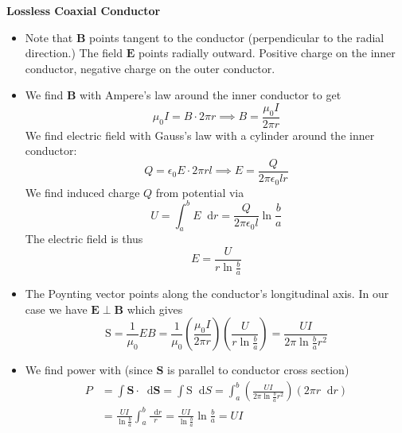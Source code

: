 \documentclass[11pt, a4paper]{article}
\newcommand{\diff}{\mathop{}\!\mathrm{d}} %
\renewcommand{\vec}[1]{\bm{#1}} %
\newcommand{\E}{\vec{E}}  %
\newcommand{\B}{\vec{B}}  %
\renewcommand{\S}{\mathbf{S}}  %
\renewcommand{\SS}{\mathrm{S}}  %
\newcommand{\ee}{\epsilon_{0}}  %
\newcommand{\mm}{\mu_{0}}  %
\newcommand{\m}{\vec{m}}  %
\newcommand{\Poy}{Poynting\xspace}
\begin{document}
\textbf{Lossless Coaxial Conductor}
\begin{itemize}
	\item Note that $ \B $ points tangent to the conductor (perpendicular to the radial direction.) The field $ \E $ points radially outward. Positive charge on the inner conductor, negative charge on the outer conductor.
	
	\item We find $ \B $ with Ampere's law around the inner conductor to get
	\begin{equation*}
		\mm I = B \cdot 2\pi r \implies B = \frac{\mm I}{2\pi r}
	\end{equation*}
	We find electric field with Gauss's law with a cylinder around the inner conductor:
	\begin{equation*}
		Q = \ee E \cdot 2\pi r l \implies E = \frac{Q}{2\pi \ee l r}
	\end{equation*}
	We find induced charge $ Q $ from potential via
	\begin{equation*}
		U = \int_{a}^{b} E \diff r = \frac{Q}{2\pi \ee l}\ln \frac{b}{a}
	\end{equation*}
	The electric field is thus
	\begin{equation*}
		E = \frac{U}{r \ln \frac{b}{a}}
	\end{equation*}
	
	\item The \Poy vector points along the conductor's longitudinal axis. In our case we have $ \E \perp \B $ which gives
	\begin{equation*}
		\SS = \frac{1}{\mm}EB = \frac{1}{\mm} \left (\frac{\mm I}{2\pi r}\right )\left(\frac{U}{r \ln \frac{b}{a}}\right) = \frac{UI}{2 \pi \ln \frac{b}{a}r^{2}}
	\end{equation*}
	
	\item We find power with (since $ \S $ is parallel to conductor cross section) 
	\begin{align*}
		P &= \int \S \cdot \diff \vec{S} = \int \SS \diff S = \int_{a}^{b}\left(\frac{UI}{2 \pi \ln \frac{b}{a}r^{2}}\right)(2\pi r \diff r)\\
		& = \frac{UI}{\ln \frac{b}{a}} \int_{a}^{b} \frac{\diff r}{r} =	\frac{UI}{\ln \frac{b}{a}}\ln \frac{b}{a} = UI
	\end{align*}
	
\end{itemize}
\end{document}
